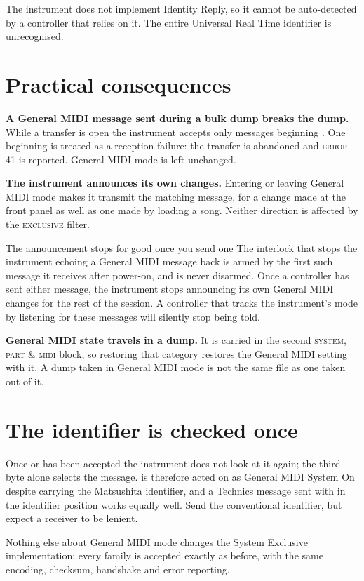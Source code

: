 The instrument does not implement Identity Reply, so it cannot be auto-detected by a
controller that relies on it. The entire Universal Real Time identifier  is
unrecognised.

\section{Practical consequences}
\textbf{A General MIDI message sent during a bulk dump breaks the dump.} While a transfer
is open the instrument accepts only messages beginning . One beginning
 is treated as a reception failure: the transfer is abandoned and
\textsc{error 41} is reported. General MIDI mode is left unchanged.

\textbf{The instrument announces its own changes.} Entering or leaving General MIDI mode
makes it transmit the matching message, for a change made at the front panel as well as
one made by loading a song. Neither direction is affected by the \textsc{exclusive}
filter.

\begin{caution}{The announcement stops for good once you send one}
The interlock that stops the instrument echoing a General MIDI message back is armed by
the first such message it receives after power-on, and is never disarmed. Once a
controller has sent either message, the instrument stops announcing its own General MIDI
changes for the rest of the session. A controller that tracks the instrument's mode by
listening for these messages will silently stop being told.
\end{caution}

\textbf{General MIDI state travels in a dump.} It is carried in the second
\textsc{system, part \& midi} block, so restoring that category restores the General MIDI
setting with it. A dump taken in General MIDI mode is not the same file as one taken out
of it.

\section{The identifier is checked once}
Once  or  has been accepted the instrument does not look at it again;
the third byte alone selects the message.  is therefore acted on
as General MIDI System On despite carrying the Matsushita identifier, and a Technics
message sent with  in the identifier position works equally well. Send the
conventional identifier, but expect a receiver to be lenient.

Nothing else about General MIDI mode changes the System Exclusive implementation: every
family is accepted exactly as before, with the same encoding, checksum, handshake and
error reporting.
